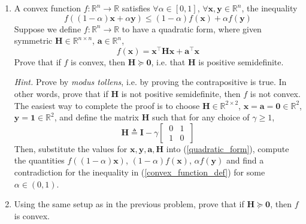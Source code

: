 \documentclass{article}
\numberwithin{equation}{section}
\begin{document}
\begin{enumerate}
    \item
    A convex function $ f : \mathbb{R}^n \rightarrow \mathbb{R} $ satisfies
    $ \forall \alpha \in [0, 1] $, $ \forall \mathbf{x}, \mathbf{y} \in
    \mathbb{R}^n $, the inequality
    \begin{equation} \label{convex_function_def}
        f((1 - \alpha)\mathbf{x} + \alpha\mathbf{y}) \le
        (1 - \alpha)f(\mathbf{x}) + \alpha f(\mathbf{y})
    \end{equation}
    Suppose we define $ f : \mathbb{R}^n \rightarrow
    \mathbb{R} $ to have a quadratic form, where given symmetric
    $ \mathbf{H} \in \mathbb{R}^{n \times n} $, $ \mathbf{a} \in \mathbb{R}^n $,
    \begin{equation} \label{quadratic_form}
        f(\mathbf{x}) = \mathbf{x}^\top\mathbf{Hx} + \mathbf{a}^\top\mathbf{x}
    \end{equation}
    Prove that if $ f $ is convex, then $ \mathbf{H} \succeq \mathbf{0} $, i.e.
    that $ \mathbf{H} $ is positive semidefinite.

    \medskip

    \textit{Hint.} Prove by \textit{modus tollens}, i.e. by proving the
    contrapositive is true. In other words, prove that if $ \mathbf{H} $ is not
    positive semidefinite, then $ f $ is not convex. The easiest way to complete
    the proof is to choose $ \mathbf{H} \in \mathbb{R}^{2 \times 2} $,
    $ \mathbf{x} = \mathbf{a} = \mathbf{0} \in \mathbb{R}^2 $, $ \mathbf{y} =
    \mathbf{1} \in \mathbb{R}^2 $, and define the matrix $ \mathbf{H} $ such
    that for any choice of $ \gamma \ge 1 $,
    \begin{equation*}
        \mathbf{H} \triangleq \mathbf{I} -
        \gamma\begin{bmatrix} \ 0 & 1 \ \\ \ 1 & 0 \ \end{bmatrix}
    \end{equation*}
    Then, substitute the values for $ \mathbf{x}, \mathbf{y}, \mathbf{a},
    \mathbf{H} $ into (\ref{quadratic_form}), compute the quantities
    $ f((1 - \alpha)\mathbf{x}) $, $ (1 - \alpha)f(\mathbf{x}) $,
    $ \alpha f(\mathbf{y}) $ and find a contradiction for the inequality in
    (\ref{convex_function_def}) for some $ \alpha \in  (0, 1) $.

    \item
    Using the same setup as in the previous problem, prove that if
    $ \mathbf{H} \succeq \mathbf{0} $, then $ f $ is convex.


\end{enumerate}
\end{document}
